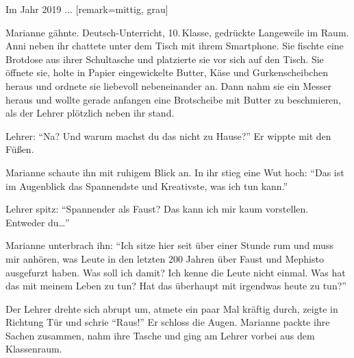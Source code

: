 \label{cha:2019_marianne}

Im Jahr 2019 ... [remark={mittig, grau}]

Marianne gähnte. Deutsch-Unterricht, 10.\,Klasse, gedrückte Langeweile im Raum.
Anni neben ihr chattete unter dem Tisch mit ihrem Smartphone.
Sie fischte eine Brotdose aus ihrer Schultasche und platzierte sie vor sich auf den Tisch.
Sie öffnete sie, holte in Papier eingewickelte Butter, Käse und Gurkenscheibchen heraus und ordnete sie liebevoll nebeneinander an.
Dann nahm sie ein Messer heraus und wollte gerade anfangen eine Brotscheibe mit Butter zu beschmieren, als der Lehrer plötzlich neben ihr stand.


Lehrer: \enquote{Na? Und warum machst du das nicht zu Hause?} Er wippte mit den Füßen.

Marianne schaute ihn mit ruhigem Blick an.
In ihr stieg eine Wut hoch: \enquote{Das ist im Augenblick das Spannendste und Kreativste, was ich tun kann.}

Lehrer spitz: \enquote{Spannender als Faust? Das kann ich mir kaum vorstellen.
Entweder du\dots}

Marianne unterbrach ihn: \enquote{Ich sitze hier seit über einer Stunde rum und muss mir anhören, was Leute in den letzten 200 Jahren über Faust und Mephisto ausgefurzt haben.
Was soll ich damit?
Ich kenne die Leute nicht einmal.
Was hat das mit meinem Leben zu tun?
Hat das überhaupt mit irgendwas heute zu tun?} 

Der Lehrer drehte sich abrupt um, atmete ein paar Mal kräftig durch, zeigte in Richtung Tür und schrie \enquote{Raus!}
Er schloss die Augen.
Marianne packte ihre Sachen zusammen, nahm ihre Tasche und ging am Lehrer vorbei aus dem Klassenraum.

